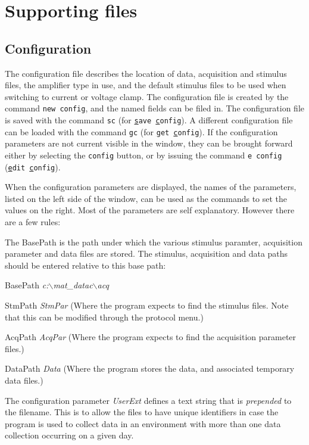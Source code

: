 \documentclass[11pt, letterpaper, titlepage]{paper}
\begin{document}
\section{Supporting files}
\subsection{Configuration}
The configuration file describes the location of data, acquisition and stimulus files, 
the amplifier type in use, and the default stimulus files to be used when switching to 
current or voltage clamp. The configuration file is created by the command \texttt {new 
config}, and the named fields can be filed in. The configuration file is saved with the 
command \texttt{sc} (for \texttt{\underline{s}ave \underline{c}onfig}). A different 
configuration file can be loaded with the command \texttt{gc} (for 
\texttt{\underline{g}et \underline{c}onfig}). If the configuration parameters are not 
current visible in the window, they can be brought forward either by selecting the 
\texttt{config} button, or by issuing the command \texttt{e config} 
(\texttt{\underline{e}dit \underline{c}onfig}).

When the configuration parameters are displayed, the names of the 
parameters, listed on the left side of the window, can be used as 
the commands to set the values on the right. Most of the 
parameters are self explanatory. However there are a few rules:

The BasePath is the path under which the various stimulus 
paramter, acquisition parameter and data files are stored. The 
stimulus, acquisition and data paths should be entered relative to 
this base path:

BasePath \textsl{c:$\backslash$mat\_datac$\backslash$acq}

StmPath \textsl{StmPar} (Where the program expects to find the 
stimulus files. Note that this can be modified through the 
protocol menu.)

AcqPath \textsl{AcqPar} (Where the program expects to find the 
acquisition parameter files.)

DataPath \textsl{Data} (Where the program stores the data, and 
associated temporary data files.)

The configuration parameter \textsl{UserExt} defines a text string 
that is \textit{prepended} to the filename. This is to allow the 
files to have unique identifiers in case the program is used to 
collect data in an environment with more than one data collection 
occurring on a given day.
\end{document}
